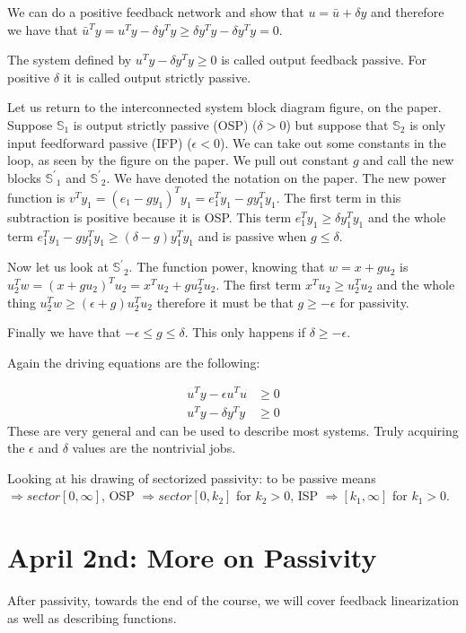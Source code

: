 \documentclass[11pt]{article}
\begin{document}
We can do a positive feedback network and show that $u = \bar{u} + \delta y$ and therefore we have that $\bar{u}^Ty = u^Ty - \delta y^Ty \geq \delta y^Ty - \delta y^Ty =0$.

The system defined by $u^Ty - \delta y^Ty \geq 0$ is called output feedback passive. For positive $\delta$ it is called output strictly passive.

Let us return to the interconnected system block diagram figure, on the paper. Suppose $\mathbb{S}_1$ is output strictly passive (OSP) ($\delta > 0$) but suppose that  $\mathbb{S}_2$ is only input feedforward passive (IFP) ($\epsilon < 0$). We can take out some constants in the loop, as seen by the figure on the paper. We pull out constant $g$ and call the new blocks $\mathbb{S^\prime}_1$ and $\mathbb{S^\prime}_2$. We have denoted the notation on the paper. The new power function is $v^Ty_1 = (e_1 - gy_1)^Ty_1 = e_1^Ty_1 - gy_1^Ty_1$. The first term in this subtraction is positive because it is OSP. This term $e_1^Ty_1 \geq \delta y_1^Ty_1$ and the whole term $e_1^Ty_1 - gy_1^Ty_1 \geq (\delta - g)y_1^Ty_1$ and is passive when $g \leq \delta$.

Now let us look at  $\mathbb{S^\prime}_2$. The function power, knowing that $w = x + gu_2$ is $u_2^Tw = (x + gu_2)^Tu_2 = x^Tu_2 + gu_2^Tu_2 $. The first term $x^Tu_2 \geq u_2^Tu_2$ and the whole thing $u_2^Tw \geq (\epsilon + g) u_2^Tu_2$ therefore it must be that $g \geq - \epsilon$ for passivity.

Finally we have that $-\epsilon \leq g \leq \delta$. This only happens if $\delta \geq - \epsilon$.

Again the driving equations are the following: 

\begin{align}
	u^Ty - \epsilon u^Tu & \geq 0 \\
	u^Ty - \delta y^Ty & \geq 0
\end{align}
These are very general and can be used to describe most systems. Truly acquiring the $\epsilon$ and $\delta$ values are the nontrivial jobs.

Looking at his drawing of sectorized passivity: to be passive means $\Rightarrow sector[0,\infty]$, OSP $\Rightarrow sector[0,k_2]$ for $k_2 > 0$, ISP $\Rightarrow[k_1,\infty]$ for $k_1>0$.




\section*{April 2nd: More on Passivity}
After passivity, towards the end of the course, we will cover feedback linearization as well as describing functions.
\end{document}
